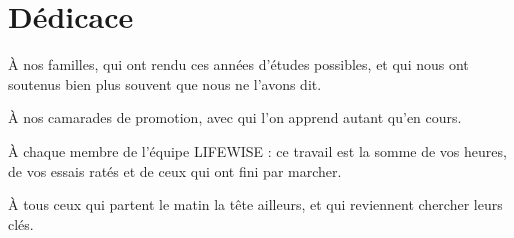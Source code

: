 \chapter*{\textcolor{mycolor}{Dédicace}}

\begin{center}
\itshape

\vspace{1cm}

À nos familles, qui ont rendu ces années d'études possibles, et qui nous ont soutenus bien plus souvent que nous
ne l'avons dit.

\vspace{0.8cm}

À nos camarades de promotion, avec qui l'on apprend autant qu'en cours.

\vspace{0.8cm}

À chaque membre de l'équipe LIFEWISE : ce travail est la somme de vos heures, de vos essais ratés et de ceux qui
ont fini par marcher.

\vspace{0.8cm}

À tous ceux qui partent le matin la tête ailleurs, et qui reviennent chercher leurs clés.

\end{center}
